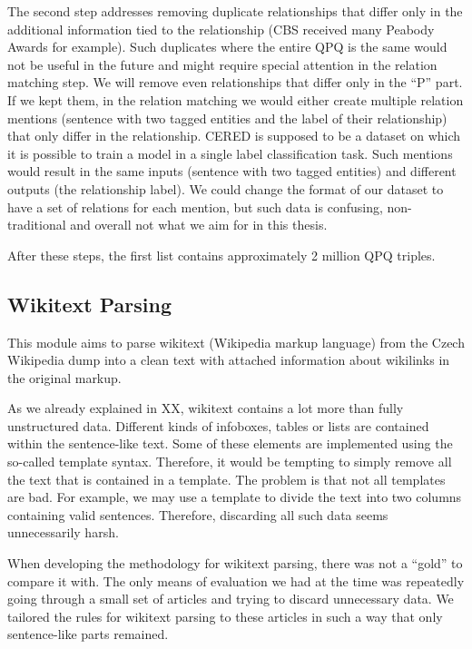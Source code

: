 The second step addresses removing duplicate relationships that differ only in the additional information tied to the relationship (CBS received many Peabody Awards for example). Such duplicates where the entire QPQ is the same would not be useful in the future and might require special attention in the relation matching step. We will remove even relationships that differ only in the “P” part. If we kept them, in the relation matching we would either create multiple relation mentions (sentence with two tagged entities and the label of their relationship) that only differ in the relationship. CERED is supposed to be a dataset on which it is possible to train a model in a single label classification task. Such mentions would result in the same inputs (sentence with two tagged entities) and different outputs (the relationship label). We could change the format of our dataset to have a set of relations for each mention, but such data is confusing, non-traditional and overall not what we aim for in this thesis. 

After these steps, the first list contains approximately 2 million QPQ triples.

\subsection{Wikitext Parsing}

\label{sec:wikiperia_parsing_implementation}

This module aims to parse wikitext (Wikipedia markup language) from the Czech Wikipedia dump into a clean text with attached information about wikilinks in the original markup.

As we already explained in XX, wikitext contains a lot more than fully unstructured data. Different kinds of infoboxes, tables or lists are contained within the sentence-like text. Some of these elements are implemented using the so-called template syntax. Therefore, it would be tempting to simply remove all the text that is contained in a template. The problem is that not all templates are bad. For example, we may use a template to divide the text into two columns containing valid sentences. Therefore, discarding all such data seems unnecessarily harsh.

When developing the methodology for wikitext parsing, there was not a “gold” to compare it with. The only means of evaluation we had at the time was repeatedly going through a small set of articles and trying to discard unnecessary data. We tailored the rules for wikitext parsing to these articles in such a way that only sentence-like parts remained. 

